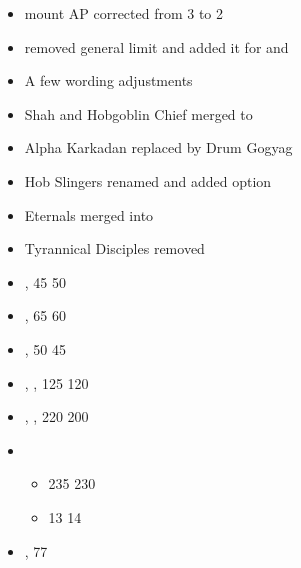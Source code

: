 

\subtitle{2021 beta 2 hotfix 1}
\begin{itemize}
	\item \drumgogyag{} mount AP corrected from 3 to 2
	\item \hobauxiliaries{} removed general  limit and added it for \slingers{} and \disciples{}
\end{itemize}

\subtitle{2021 beta 2}

\begin{itemize}
	\item A few wording adjustments
\end{itemize}


\begin{itemize}
	\item Shah and Hobgoblin Chief merged to \satrap{}
	\item Alpha Karkadan replaced by Drum Gogyag
	\item Hob Slingers renamed \hobauxiliaries{} and added \disciples{} option
	\item Eternals merged into \hobcataphracts
	\item Tyrannical Disciples removed	
\end{itemize}


	
	\begin{itemize}
		\item \wickedserrations{}, 45 \costup{} 50
		\item \elementalplate{}, 65 \costdown{} 60
		\item \deathheadaura{}, 50 \costdown{} 45
		\item \hoblevies{}, \basecost{}, 125 \costdown{} 120
		\item \drumgogyag{}, \basecost{}, 220 \costdown{} 200
		\item \blastedplainemissaries{}
		\begin{itemize}
			\item \basecost{} 235 \costdown{} 230
			\item \extramodel{} 13 \costup{} 14
		\end{itemize}
		\item \skymountainemissaries{}, \extramodel{} 77 
	\end{itemize}

